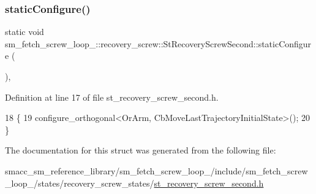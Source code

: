 \subsubsection{\texorpdfstring{static\+Configure()}{staticConfigure()}}
{\footnotesize\ttfamily static void sm\+\_\+fetch\+\_\+screw\+\_\+loop\+\_\+::recovery\+\_\+screw\+::\+St\+Recovery\+Screw\+Second\+::static\+Configure (\begin{DoxyParamCaption}{ }\end{DoxyParamCaption})\hspace{0.3cm}{\ttfamily [inline]}, {\ttfamily [static]}}



Definition at line 17 of file st\+\_\+recovery\+\_\+screw\+\_\+second.\+h.


\begin{DoxyCode}
18             \{
19                 configure\_orthogonal<OrArm, CbMoveLastTrajectoryInitialState>();
20             \}
\end{DoxyCode}


The documentation for this struct was generated from the following file\+:\begin{DoxyCompactItemize}
\item 
smacc\+\_\+sm\+\_\+reference\+\_\+library/sm\+\_\+fetch\+\_\+screw\+\_\+loop\+\_/include/sm\+\_\+fetch\+\_\+screw\+\_\+loop\+\_/states/recovery\+\_\+screw\+\_\+states/\hyperlink{sm__fetch__screw__loop__1_2include_2sm__fetch__screw__loop__1_2states_2recovery__screw__states_2st__recovery__screw__second_8h}{st\+\_\+recovery\+\_\+screw\+\_\+second.\+h}\end{DoxyCompactItemize}
